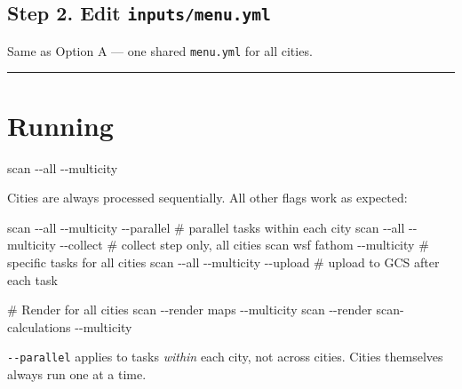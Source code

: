 \documentclass[
  letterpaper,
  DIV=11,
  numbers=noendperiod]{scrreprt}
\newenvironment{Shaded}{\begin{snugshade}}{\end{snugshade}}
\newcommand{\AttributeTok}[1]{\textcolor[rgb]{0.40,0.45,0.13}{#1}}
\newcommand{\CommentTok}[1]{\textcolor[rgb]{0.37,0.37,0.37}{#1}}
\newcommand{\ExtensionTok}[1]{\textcolor[rgb]{0.00,0.23,0.31}{#1}}
\newcommand{\NormalTok}[1]{\textcolor[rgb]{0.00,0.23,0.31}{#1}}
\begin{document}
\subsection{\texorpdfstring{Step 2. Edit
\texttt{inputs/menu.yml}}{Step 2. Edit inputs/menu.yml}}\label{step-2.-edit-inputsmenu.yml}

Same as Option A --- one shared \texttt{menu.yml} for all cities.

\begin{center}\rule{0.5\linewidth}{0.5pt}\end{center}

\section{Running}\label{running}

\begin{Shaded}
\begin{Highlighting}[]
\ExtensionTok{scan} \AttributeTok{{-}{-}all} \AttributeTok{{-}{-}multicity}
\end{Highlighting}
\end{Shaded}

Cities are always processed sequentially. All other flags work as
expected:

\begin{Shaded}
\begin{Highlighting}[]
\ExtensionTok{scan} \AttributeTok{{-}{-}all} \AttributeTok{{-}{-}multicity} \AttributeTok{{-}{-}parallel}      \CommentTok{\# parallel tasks within each city}
\ExtensionTok{scan} \AttributeTok{{-}{-}all} \AttributeTok{{-}{-}multicity} \AttributeTok{{-}{-}collect}       \CommentTok{\# collect step only, all cities}
\ExtensionTok{scan}\NormalTok{ wsf fathom }\AttributeTok{{-}{-}multicity}            \CommentTok{\# specific tasks for all cities}
\ExtensionTok{scan} \AttributeTok{{-}{-}all} \AttributeTok{{-}{-}multicity} \AttributeTok{{-}{-}upload}        \CommentTok{\# upload to GCS after each task}

\CommentTok{\# Render for all cities}
\ExtensionTok{scan} \AttributeTok{{-}{-}render}\NormalTok{ maps }\AttributeTok{{-}{-}multicity} 
\ExtensionTok{scan} \AttributeTok{{-}{-}render}\NormalTok{ scan{-}calculations }\AttributeTok{{-}{-}multicity}
\end{Highlighting}
\end{Shaded}

\begin{tcolorbox}[enhanced jigsaw, arc=.35mm, bottomrule=.15mm, bottomtitle=1mm, breakable, colback=white, colbacktitle=quarto-callout-note-color!10!white, colframe=quarto-callout-note-color-frame, coltitle=black, left=2mm, leftrule=.75mm, opacityback=0, opacitybacktitle=0.6, rightrule=.15mm, title=\textcolor{quarto-callout-note-color}{\faInfo}\hspace{0.5em}{Note}, titlerule=0mm, toprule=.15mm, toptitle=1mm]

\texttt{-\/-parallel} applies to tasks \emph{within} each city, not
across cities. Cities themselves always run one at a time.

\end{tcolorbox}
\end{document}
